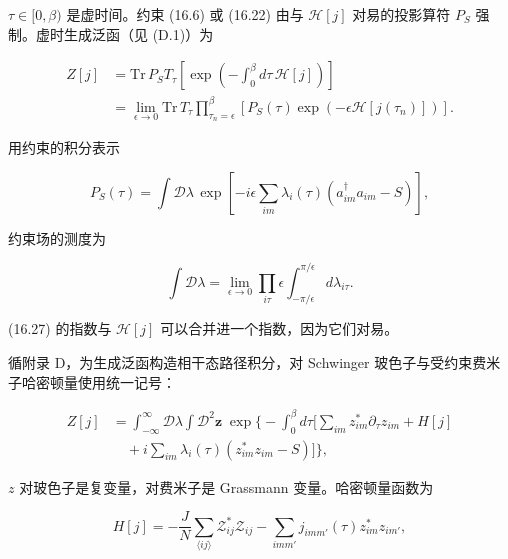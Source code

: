$\tau\in[0,\beta)$ 是虚时间。约束 (16.6) 或 (16.22) 由与 $\mathcal{H}[j]$ 对易的投影算符 $P_{S}$ 强制。虚时生成泛函（见 (D.1)）为

\begin{align*}
Z [ j ] & = \mathrm{Tr} \, P _ {S} T _ {\tau} \left[ \exp \left( - \int_ {0} ^ {\beta} d \tau \, \mathcal {H} [ j ] \right) \right]\\
& = \lim_{\epsilon \to 0} \mathrm{Tr} \, T _ {\tau} \prod_{\tau_ {n} = \epsilon} ^ {\beta} \left[ P _ {S} ( \tau ) \exp \left( - \epsilon \mathcal {H} [ j ( \tau_ {n} ) ] \right) \right] .
\tag{16.26}
\end{align*}

用约束的积分表示

\begin{equation*}
P _ {S} ( \tau ) = \int \mathcal {D} \lambda \, \exp \left[ - i \epsilon \sum_ {im} \lambda_ {i} ( \tau ) \left( a _ {im} ^ {\dagger} a _ {im} - S \right) \right] ,
\tag{16.27}
\end{equation*}

约束场的测度为

\begin{equation*}
\int \mathcal {D} \lambda = \lim_{\epsilon \rightarrow 0} \prod_{i \tau} \epsilon \int_{- \pi / \epsilon} ^ {\pi / \epsilon} d \lambda_{i \tau}.
\tag{16.28}
\end{equation*}

(16.27) 的指数与 $\mathcal{H}[j]$ 可以合并进一个指数，因为它们对易。

循附录 D，为生成泛函构造相干态路径积分，对 Schwinger 玻色子与受约束费米子哈密顿量使用统一记号：

\begin{align*}
Z [ j ] & = \int_{- \infty} ^ {\infty} \mathcal {D} \lambda \int \mathcal {D} ^ {2} \mathbf {z} \; \exp \Bigg\{ - \int_ {0} ^ {\beta} d \tau \Big[ \sum_ {im} z _ {im} ^ {*} \partial_ {\tau} z _ {im} + H [ j ]\\
& \quad + i \sum_ {im} \lambda_ {i} ( \tau ) \left( z _ {im} ^ {*} z _ {im} - S \right) \Big] \Bigg\} ,
\tag{16.29}
\end{align*}

$z$ 对玻色子是复变量，对费米子是 Grassmann 变量。哈密顿量函数为

\begin{equation*}
H [ j ] = - \frac {J}{N} \sum_{\langle ij \rangle} \mathcal {Z} _ {ij} ^ {*} \mathcal {Z} _ {ij} - \sum_ {imm '} j _ {imm '} ( \tau ) z _ {im} ^ {*} z _ {im '} ,
\tag{16.30}
\end{equation*}

